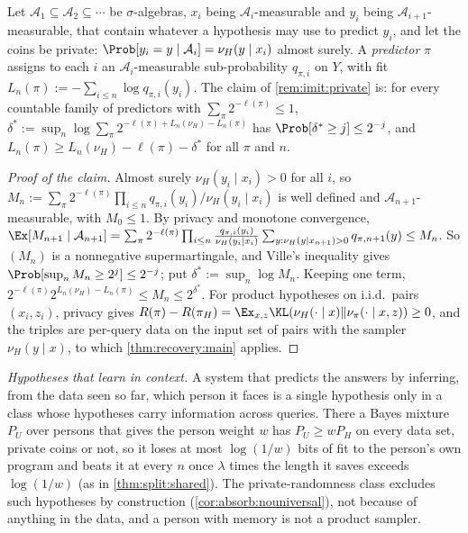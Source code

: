 Let $\mathcal A_1\subseteq\mathcal A_2\subseteq\cdots$ be $\sigma$-algebras, $x_i$ being $\mathcal A_i$-measurable and $y_i$ being $\mathcal A_{i+1}$-measurable, that contain whatever a hypothesis may use to predict $y_i$, and let the coins be private: $\Prob[y_i=y\mid\mathcal A_i]=\nu_H(y\mid x_i)$ almost surely. A \emph{predictor} $\pi$ assigns to each $i$ an $\mathcal A_i$-measurable sub-probability $q_{\pi,i}$ on $Y$, with fit $L_n(\pi):=-\sum_{i\le n}\log q_{\pi,i}(y_i)$. The claim of \cref{rem:imit:private} is: for every countable family of predictors with $\sum_\pi2^{-\ell(\pi)}\le1$, $\delta^*:=\sup_n\log\sum_\pi2^{-\ell(\pi)+L_n(\nu_H)-L_n(\pi)}$ has $\Prob[\delta^*\ge j]\le2^{-j}$, and $L_n(\pi)\ge L_n(\nu_H)-\ell(\pi)-\delta^*$ for all $\pi$ and $n$.

\begin{proof}[Proof of the claim]
Almost surely $\nu_H(y_i\mid x_i)>0$ for all $i$, so $M_n:=\sum_\pi2^{-\ell(\pi)}\prod_{i\le n}q_{\pi,i}(y_i)/\nu_H(y_i\mid x_i)$ is well defined and $\mathcal A_{n+1}$-measurable, with $M_0\le1$. By privacy and monotone convergence, $\Ex[M_{n+1}\mid\mathcal A_{n+1}]=\sum_\pi2^{-\ell(\pi)}\prod_{i\le n}\frac{q_{\pi,i}(y_i)}{\nu_H(y_i\mid x_i)}\sum_{y:\nu_H(y\mid x_{n+1})>0}q_{\pi,n+1}(y)\le M_n$. So $(M_n)$ is a nonnegative supermartingale, and Ville's inequality \citep{ville1939etude} gives $\Prob[\sup_nM_n\ge2^j]\le2^{-j}$; put $\delta^*:=\sup_n\log M_n$. Keeping one term, $2^{-\ell(\pi)}2^{L_n(\nu_H)-L_n(\pi)}\le M_n\le2^{\delta^*}$. For product hypotheses on i.i.d.\ pairs $(x_i,z_i)$, privacy gives $R(\pi)-R(\pi_H)=\Ex_{x,z}\KL(\nu_H(\cdot\mid x)\Vert\nu_\pi(\cdot\mid x,z))\ge0$, and the triples are per-query data on the input set of pairs with the sampler $\nu_H(y\mid x)$, to which \cref{thm:recovery:main} applies.
\end{proof}

\emph{Hypotheses that learn in context.} A system that predicts the answers by inferring, from the data seen so far, which person it faces is a single hypothesis only in a class whose hypotheses carry information across queries. There a Bayes mixture $P_U$ over persons that gives the person weight $w$ has $P_U\ge wP_H$ on every data set, private coins or not, so it loses at most $\log(1/w)$ bits of fit to the person's own program and beats it at every $n$ once $\lambda$ times the length it saves exceeds $\log(1/w)$ (as in \cref{thm:split:shared}). The private-randomness class excludes such hypotheses by construction (\cref{cor:absorb:nouniversal}), not because of anything in the data, and a person with memory is not a product sampler.

